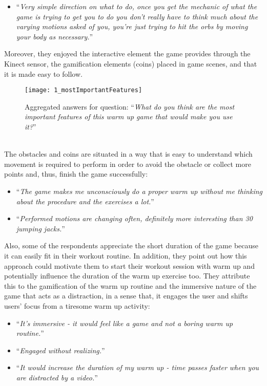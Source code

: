 \begin{itemize}
\item ``\textit{Very simple direction on what to do, once you get the mechanic of what the game is trying to get you to do you don't really have to think much about the varying motions asked of you, you're just trying to hit the orbs by moving your body as necessary.}''
\end{itemize} 
Moreover, they enjoyed the interactive element the game provides through the Kinect sensor, the gamification elements (coins) placed in game scenes, and that it is made easy to follow. \\
\begin{figure}[h]
    \centering
    \texttt{[image: 1\_mostImportantFeatures]}
    \caption[Results for most important features of the exergame.] {Aggregated answers for question: ``\textit{What do you think are the most important features of this warm up game that would make you use it?}''}
    \label{fig:1_mostImportantFeatures}
\end{figure}\\The obstacles and coins are situated in a way that is easy to understand which movement is required to perform in order to avoid the obstacle or collect more points and, thus, finish the game successfully:
\begin{itemize}
\item ``\textit{The game makes me unconsciously do a proper warm up without me thinking about the procedure and the exercises a lot.}''
\item ``\textit{Performed motions are changing often, definitely more interesting than 30 jumping jacks.}''
\end{itemize} 
Also, some of the respondents appreciate the short duration of the game because it can easily fit in their workout routine. In addition, they point out how this approach could motivate them to start their workout session with warm up and potentially influence the duration of the warm up exercise too. They attribute this to the gamification of the warm up routine and the immersive nature of the game that acts as a distraction, in a sense that, it engages the user and shifts users' focus from a tiresome warm up activity:  
\begin{itemize}
\item ``\textit{It's immersive - it would feel like a game and not a boring warm up routine.}''
\item ``\textit{Engaged without realizing.}''
\item ``\textit{It would increase the duration of my warm up - time passes faster when you are distracted by a video.}''
\end{itemize} 
